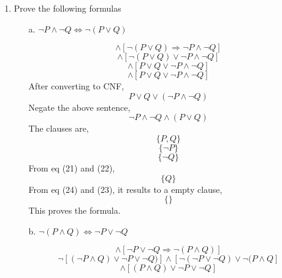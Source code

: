 \documentclass[11pt, a4paper]{report}
\begin{document}
\begin{enumerate}
\item Prove the following formulas
\begin{itemize}

\item[a.] $\neg P \wedge \neg Q \Longleftrightarrow \neg ( P \vee Q)$

\begin{equation}
[\neg P \wedge \neg Q \Rightarrow \neg ( P \vee Q)] \wedge [\neg(P \vee Q) \Rightarrow \neg P \wedge \neg Q] 
\end{equation}
\begin{equation}
[P \vee Q \vee \neg(P \vee Q)] \wedge [ \neg (P \vee Q) \vee \neg P \wedge \neg Q]
\end{equation}
\begin{equation}
[P \vee Q \vee \neg (P \vee Q)] \wedge [P \vee Q \vee \neg P \wedge \neg Q]
\end{equation}
\begin{equation}
[P \vee Q \vee \neg P \wedge \neg Q)] \wedge [P \vee Q \vee \neg P \wedge \neg Q]
\end{equation}
After converting to CNF,
\begin{equation}
P \vee Q \vee (\neg P \wedge \neg Q)
\end{equation}
Negate the above sentence,
\begin{equation}
\neg P \wedge \neg Q \wedge (P \vee Q)
\end{equation}
The clauses are,
\begin{equation}
\lbrace P, Q \rbrace
\end{equation}
\begin{equation}
\lbrace \neg P \rbrace
\end{equation}
\begin{equation}
\lbrace \neg Q \rbrace
\end{equation}
From eq (21) and (22),
\begin{equation}
\lbrace Q \rbrace
\end{equation}
From eq (24) and (23), it results to a empty clause,
\begin{equation}
\lbrace  \rbrace
\end{equation}
This proves the formula.\\

\item[b.] $\neg (P \wedge Q) \Longleftrightarrow \neg P \vee \neg Q$

\begin{equation}
[\neg( P \wedge Q) \Rightarrow \neg P \vee \neg Q)] \wedge [\neg P \vee \neg Q \Rightarrow \neg (P \wedge Q)] 
\end{equation}
\begin{equation}
\neg [(\neg P \wedge Q) \vee \neg P \vee \neg Q)] \wedge [ \neg (\neg P \vee \neg Q) \vee \neg (P \wedge Q]
\end{equation}
\begin{equation}
[P \wedge Q \vee \neg P \vee \neg Q)] \wedge [(P \wedge Q) \vee \neg P \vee \neg Q]
\end{equation}


\end{itemize}
\end{enumerate}
\end{document}
